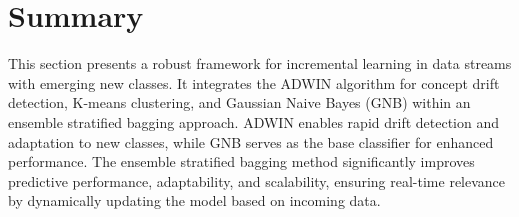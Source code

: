\section{Summary}
\label{sec:5_summary}
This section presents a robust framework for incremental learning in data streams with emerging new classes. It integrates the ADWIN algorithm for concept drift detection, K-means clustering, and Gaussian Naive Bayes (GNB) within an ensemble stratified bagging approach. ADWIN enables rapid drift detection and adaptation to new classes, while GNB serves as the base classifier for enhanced performance. The ensemble stratified bagging method significantly improves predictive performance, adaptability, and scalability, ensuring real-time relevance by dynamically updating the model based on incoming data.